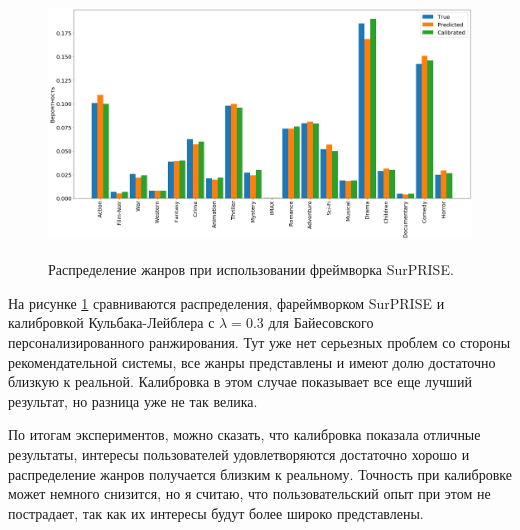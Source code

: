    \begin{figure}[ht]
   \begin{flushleft}
      \includegraphics[width=15cm, height=7cm]{images/cal_surp.png}
   
   \caption{
   \label{graph-SUR}
        Распределение жанров при использовании фреймворка SurPRISE.}
   \end {flushleft}
   \end {figure}



      На рисунке \ref{graph-SUR} сравниваются распределения, фареймворком SurPRISE и калибровкой Кульбака-Лейблера с ${\lambda=0.3}$ для Байесовского персонализированного ранжирования.
      Тут уже нет серьезных проблем со стороны рекомендательной системы, все жанры представлены и
      имеют долю достаточно близкую к реальной. Калибровка в этом случае показывает все еще лучший результат, но разница уже не так велика.

      По итогам экспериментов, можно сказать, что калибровка показала отличные результаты,
      интересы пользователей удовлетворяются достаточно хорошо и распределение жанров получается близким к реальному.
      Точность при калибровке может немного снизится, но я считаю, что пользовательский опыт при этом не пострадает, так как их интересы будут более широко представлены.


\pagebreak

